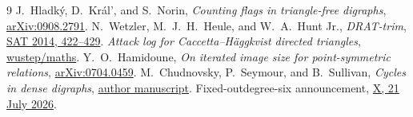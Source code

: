 \documentclass[10pt]{article}
\begin{document}
\begin{thebibliography}{9}
J.~Hladk\'y, D.~Kr\'al', and S.~Norin, \emph{Counting flags in
triangle-free digraphs}, \href{https://arxiv.org/abs/0908.2791}{arXiv:0908.2791}.
N.~Wetzler, M.~J.~H.~Heule, and W.~A.~Hunt Jr.,
\emph{DRAT-trim},
\href{https://doi.org/10.1007/978-3-319-09284-3_31}{SAT 2014, 422--429}.
\emph{Attack log for Caccetta--H\"aggkvist directed triangles},
\href{https://github.com/wustep/maths/blob/main/problems/caccetta-haggkvist-k3/ATTACK.md}{wustep/maths}.
Y.~O.~Hamidoune, \emph{On iterated image size for point-symmetric relations},
\href{https://arxiv.org/abs/0704.0459}{arXiv:0704.0459}.
M.~Chudnovsky, P.~Seymour, and B.~Sullivan, \emph{Cycles in dense digraphs},
\href{https://web.math.princeton.edu/~mchudnov/kover2.pdf}{author manuscript}.
Fixed-outdegree-six announcement, \href{https://x.com/jjpcodes/status/2079543801387815133}{X, 21 July 2026}.
\end{thebibliography}
\end{document}
